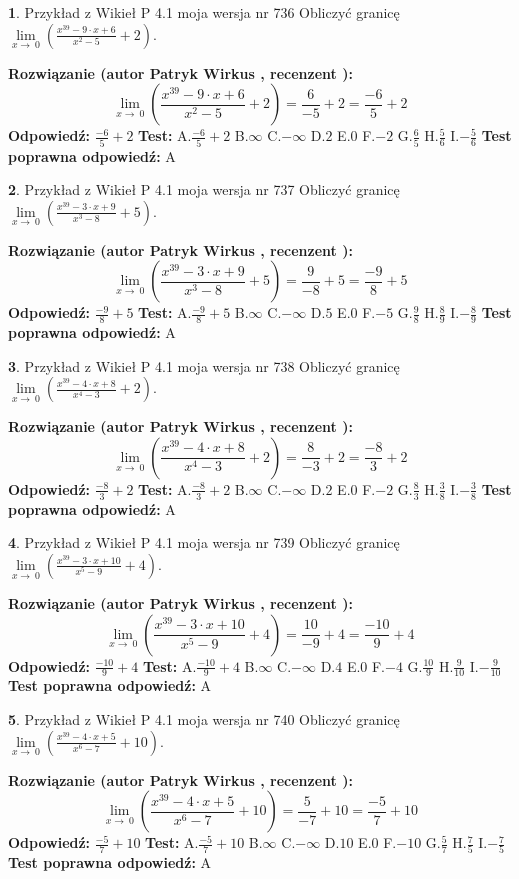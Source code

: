 \documentclass[12pt, a4paper]{article}
\theoremstyle{definition} %
\newtheorem{zad}{}
\newcommand{\zadStart}[1]{\begin{zad}#1\newline}
\newcommand{\zadStop}{\end{zad}}
\newcommand{\rozwStart}[2]{\noindent \textbf{Rozwiązanie (autor #1 , recenzent #2): }\newline}
\newcommand{\rozwStop}{\newline}
\newcommand{\odpStart}{\noindent \textbf{Odpowiedź:}\newline}
\newcommand{\odpStop}{\newline}
\newcommand{\testStart}{\noindent \textbf{Test:}\newline}
\newcommand{\testStop}{\newline}
\newcommand{\kluczStart}{\noindent \textbf{Test poprawna odpowiedź:}\newline}
\newcommand{\kluczStop}{\newline}
\begin{document}
\zadStart{Przykład z Wikieł P 4.1 moja wersja nr 736}
Obliczyć granicę $\lim\limits_{x\to\ 0}(\frac{x^{39}-9 \cdot x +6}{x^{2}-5}+2)$.
\zadStop
\rozwStart{Patryk Wirkus}{}
$$\lim\limits_{x\to\ 0}(\frac{x^{39}-9 \cdot x +6}{x^{2}-5}+2)=\frac{6}{-5}+2=\frac{-6}{5}+2$$
\rozwStop
\odpStart
$\frac{-6}{5}+2$
\odpStop
\testStart
A.$\frac{-6}{5}+2$
B.$\infty$
C.$-\infty$
D.$2$
E.$0$
F.$-2$
G.$\frac{6}{5}$
H.$\frac{5}{6}$
I.$-\frac{5}{6}$
\testStop
\kluczStart
A
\kluczStop



\zadStart{Przykład z Wikieł P 4.1 moja wersja nr 737}
Obliczyć granicę $\lim\limits_{x\to\ 0}(\frac{x^{39}-3 \cdot x +9}{x^{3}-8}+5)$.
\zadStop
\rozwStart{Patryk Wirkus}{}
$$\lim\limits_{x\to\ 0}(\frac{x^{39}-3 \cdot x +9}{x^{3}-8}+5)=\frac{9}{-8}+5=\frac{-9}{8}+5$$
\rozwStop
\odpStart
$\frac{-9}{8}+5$
\odpStop
\testStart
A.$\frac{-9}{8}+5$
B.$\infty$
C.$-\infty$
D.$5$
E.$0$
F.$-5$
G.$\frac{9}{8}$
H.$\frac{8}{9}$
I.$-\frac{8}{9}$
\testStop
\kluczStart
A
\kluczStop



\zadStart{Przykład z Wikieł P 4.1 moja wersja nr 738}
Obliczyć granicę $\lim\limits_{x\to\ 0}(\frac{x^{39}-4 \cdot x +8}{x^{4}-3}+2)$.
\zadStop
\rozwStart{Patryk Wirkus}{}
$$\lim\limits_{x\to\ 0}(\frac{x^{39}-4 \cdot x +8}{x^{4}-3}+2)=\frac{8}{-3}+2=\frac{-8}{3}+2$$
\rozwStop
\odpStart
$\frac{-8}{3}+2$
\odpStop
\testStart
A.$\frac{-8}{3}+2$
B.$\infty$
C.$-\infty$
D.$2$
E.$0$
F.$-2$
G.$\frac{8}{3}$
H.$\frac{3}{8}$
I.$-\frac{3}{8}$
\testStop
\kluczStart
A
\kluczStop



\zadStart{Przykład z Wikieł P 4.1 moja wersja nr 739}
Obliczyć granicę $\lim\limits_{x\to\ 0}(\frac{x^{39}-3 \cdot x +10}{x^{5}-9}+4)$.
\zadStop
\rozwStart{Patryk Wirkus}{}
$$\lim\limits_{x\to\ 0}(\frac{x^{39}-3 \cdot x +10}{x^{5}-9}+4)=\frac{10}{-9}+4=\frac{-10}{9}+4$$
\rozwStop
\odpStart
$\frac{-10}{9}+4$
\odpStop
\testStart
A.$\frac{-10}{9}+4$
B.$\infty$
C.$-\infty$
D.$4$
E.$0$
F.$-4$
G.$\frac{10}{9}$
H.$\frac{9}{10}$
I.$-\frac{9}{10}$
\testStop
\kluczStart
A
\kluczStop



\zadStart{Przykład z Wikieł P 4.1 moja wersja nr 740}
Obliczyć granicę $\lim\limits_{x\to\ 0}(\frac{x^{39}-4 \cdot x +5}{x^{6}-7}+10)$.
\zadStop
\rozwStart{Patryk Wirkus}{}
$$\lim\limits_{x\to\ 0}(\frac{x^{39}-4 \cdot x +5}{x^{6}-7}+10)=\frac{5}{-7}+10=\frac{-5}{7}+10$$
\rozwStop
\odpStart
$\frac{-5}{7}+10$
\odpStop
\testStart
A.$\frac{-5}{7}+10$
B.$\infty$
C.$-\infty$
D.$10$
E.$0$
F.$-10$
G.$\frac{5}{7}$
H.$\frac{7}{5}$
I.$-\frac{7}{5}$
\testStop
\kluczStart
A
\kluczStop
\end{document}
